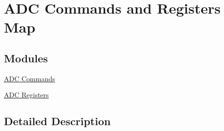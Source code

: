 \hypertarget{group___a_d_c_cmd_reg}{\section{A\-D\-C Commands and Registers Map}
\label{group___a_d_c_cmd_reg}
}
\subsection*{Modules}
\begin{DoxyCompactItemize}
\item 
\hyperlink{group___a_d_c_cmd}{A\-D\-C Commands}
\item 
\hyperlink{group___a_d_c_reg}{A\-D\-C Registers}
\end{DoxyCompactItemize}


\subsection{Detailed Description}
